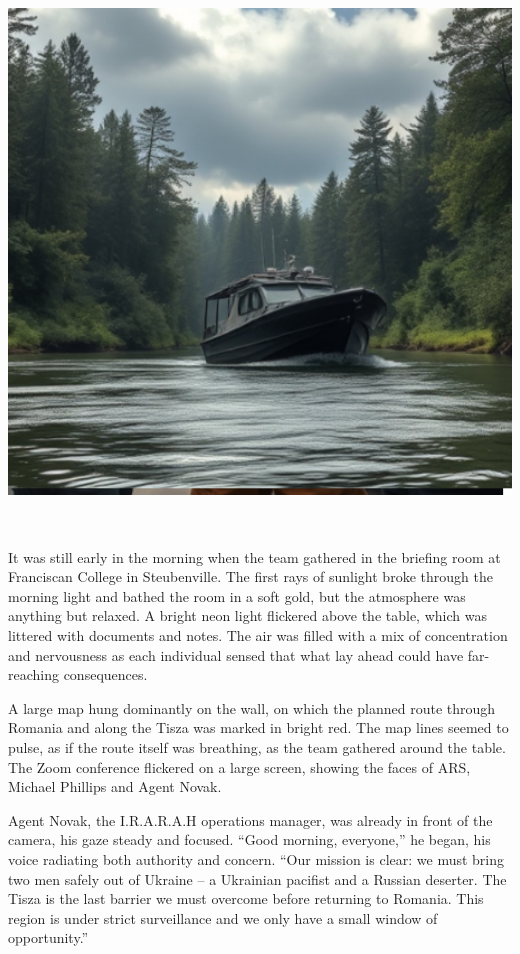 \documentclass[
]{article}
\begin{document}
\includegraphics[width=6in,height=5.78125in]{media/image007.png}

It was still early in the morning when the team gathered in the briefing
room at Franciscan College in Steubenville. The first rays of sunlight
broke through the morning light and bathed the room in a soft gold, but
the atmosphere was anything but relaxed. A bright neon light flickered
above the table, which was littered with documents and notes. The air
was filled with a mix of concentration and nervousness as each
individual sensed that what lay ahead could have far-reaching
consequences.

A large map hung dominantly on the wall, on which the planned route
through Romania and along the Tisza was marked in bright red. The map
lines seemed to pulse, as if the route itself was breathing, as the team
gathered around the table. The Zoom conference flickered on a large
screen, showing the faces of ARS, Michael Phillips and Agent Novak.

Agent Novak, the I.R.A.R.A.H operations manager, was already in front of
the camera, his gaze steady and focused. ``Good morning, everyone,'' he
began, his voice radiating both authority and concern. ``Our mission is
clear: we must bring two men safely out of Ukraine -- a Ukrainian
pacifist and a Russian deserter. The Tisza is the last barrier we must
overcome before returning to Romania. This region is under strict
surveillance and we only have a small window of opportunity.''
\end{document}
